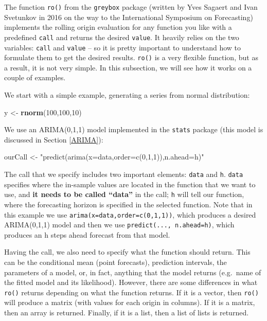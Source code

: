 \documentclass[]{book}
\newenvironment{Shaded}{\begin{snugshade}}{\end{snugshade}}
\newcommand{\DecValTok}[1]{\textcolor[rgb]{0.00,0.00,0.81}{#1}}
\newcommand{\KeywordTok}[1]{\textcolor[rgb]{0.13,0.29,0.53}{\textbf{#1}}}
\newcommand{\NormalTok}[1]{#1}
\newcommand{\StringTok}[1]{\textcolor[rgb]{0.31,0.60,0.02}{#1}}
\theoremstyle{definition}
\theoremstyle{definition}
\theoremstyle{definition}
\theoremstyle{definition}
\theoremstyle{remark}
\begin{document}
The function \texttt{ro()} from the \texttt{greybox} package (written by Yves Sagaert and Ivan Svetunkov in 2016 on the way to the International Symposium on Forecasting) implements the rolling origin evaluation for any function you like with a predefined \texttt{call} and returns the desired \texttt{value}. It heavily relies on the two variables: \texttt{call} and \texttt{value} -- so it is pretty important to understand how to formulate them to get the desired results. \texttt{ro()} is a very flexible function, but as a result, it is not very simple. In this subsection, we will see how it works on a couple of examples.

We start with a simple example, generating a series from normal distribution:

\begin{Shaded}
\begin{Highlighting}[]
\NormalTok{y <-}\StringTok{ }\KeywordTok{rnorm}\NormalTok{(}\DecValTok{100}\NormalTok{,}\DecValTok{100}\NormalTok{,}\DecValTok{10}\NormalTok{)}
\end{Highlighting}
\end{Shaded}

We use an ARIMA(0,1,1) model implemented in the \texttt{stats} package (this model is discussed in Section \ref{ARIMA}):

\begin{Shaded}
\begin{Highlighting}[]
\NormalTok{ourCall <-}\StringTok{ "predict(arima(x=data,order=c(0,1,1)),n.ahead=h)"}
\end{Highlighting}
\end{Shaded}

The call that we specify includes two important elements: \texttt{data} and \texttt{h}. \texttt{data} specifies where the in-sample values are located in the function that we want to use, and \textbf{it needs to be called ``data''} in the call; \texttt{h} will tell our function, where the forecasting horizon is specified in the selected function. Note that in this example we use \texttt{arima(x=data,order=c(0,1,1))}, which produces a desired ARIMA(0,1,1) model and then we use \texttt{predict(...,\ n.ahead=h)}, which produces an h steps ahead forecast from that model.

Having the call, we also need to specify what the function should return. This can be the conditional mean (point forecasts), prediction intervals, the parameters of a model, or, in fact, anything that the model returns (e.g.~name of the fitted model and its likelihood). However, there are some differences in what \texttt{ro()} returns depending on what the function returns. If it is a vector, then \texttt{ro()} will produce a matrix (with values for each origin in columns). If it is a matrix, then an array is returned. Finally, if it is a list, then a list of lists is returned.
\end{document}
